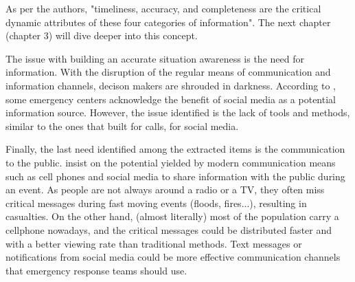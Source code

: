 As per the authors, "timeliness, accuracy, and completeness are the critical dynamic attributes of these four categories of information".
The next chapter (chapter 3) will dive deeper into this concept.

The issue with building an accurate situation awareness is the need for information.
With the disruption of the regular means of communication and information channels, decison makers are shrouded in darkness.
According to \textcite{tapiaTrustworthyTweetDeeper2013,cobbDesigningDelugeUnderstanding2014}, some emergency centers acknowledge the benefit of social media as a potential information source.
However, the issue identified is the lack of tools and methods, similar to the ones that built for calls, for social media.

Finally, the last need identified among the extracted items is the communication to the public.
\textcite{aloudatRegulationUbiquitousMobile2011} insist on the potential yielded by modern communication means such as cell phones and social media to share information with the public during an event.
As people are not always around a radio or a TV, they often miss critical messages during fast moving events (floods, fires...), resulting in casualties.
On the other hand, (almost literally) most of the population carry a cellphone nowadays, and the critical messages could be distributed faster and with a better viewing rate than traditional methods.
Text messages or notifications from social media could be more effective communication channels that emergency response teams should use.

